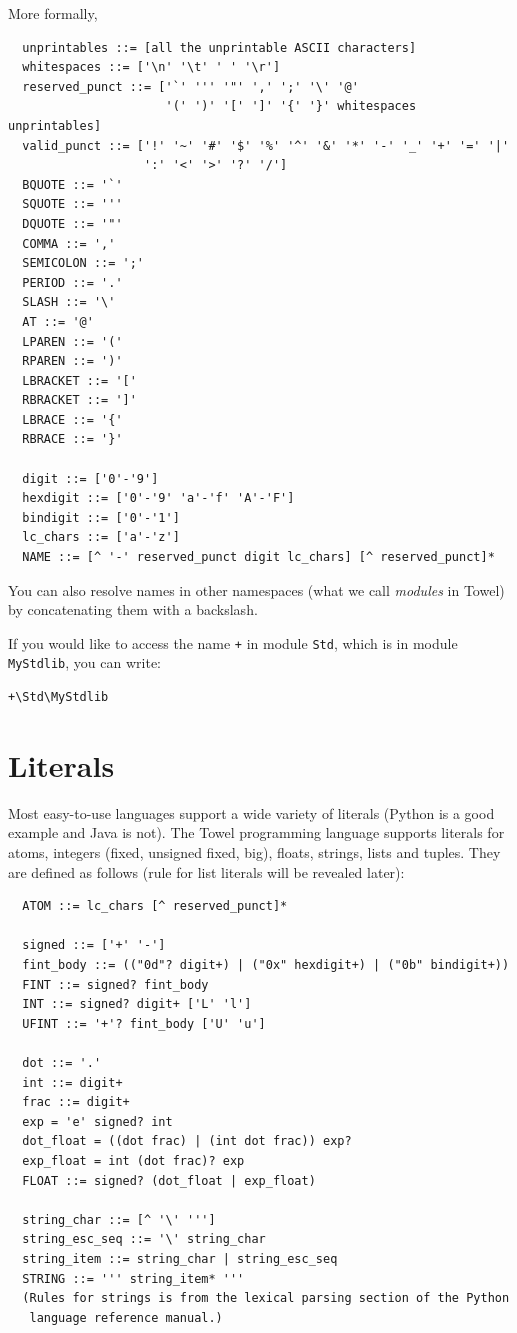 \documentclass{report}
\begin{document}
More formally,
\begin{verbatim}
  unprintables ::= [all the unprintable ASCII characters]
  whitespaces ::= ['\n' '\t' ' ' '\r']
  reserved_punct ::= ['`' ''' '"' ',' ';' '\' '@' 
                      '(' ')' '[' ']' '{' '}' whitespaces unprintables]
  valid_punct ::= ['!' '~' '#' '$' '%' '^' '&' '*' '-' '_' '+' '=' '|'
                   ':' '<' '>' '?' '/']
  BQUOTE ::= '`'
  SQUOTE ::= '''
  DQUOTE ::= '"'
  COMMA ::= ','
  SEMICOLON ::= ';'
  PERIOD ::= '.'
  SLASH ::= '\'
  AT ::= '@'
  LPAREN ::= '('
  RPAREN ::= ')'
  LBRACKET ::= '['
  RBRACKET ::= ']'
  LBRACE ::= '{'
  RBRACE ::= '}'

  digit ::= ['0'-'9']
  hexdigit ::= ['0'-'9' 'a'-'f' 'A'-'F']
  bindigit ::= ['0'-'1']
  lc_chars ::= ['a'-'z']
  NAME ::= [^ '-' reserved_punct digit lc_chars] [^ reserved_punct]*
\end{verbatim}

You can also resolve names in other namespaces (what we call \textit{modules} in Towel) by concatenating them with a backslash.

\begin{mdframed}[style=example]
If you would like to access the name \texttt{+} in module \texttt{Std}, which is in module \texttt{MyStdlib}, you can write:

\begin{verbatim}
+\Std\MyStdlib
\end{verbatim}

\end{mdframed}

\section{Literals}

Most easy-to-use languages support a wide variety of literals (Python is a good example and Java is not). The Towel programming language supports literals for atoms, integers (fixed, unsigned fixed, big), floats, strings, lists and tuples. They are defined as follows (rule for list literals will be revealed later):
\begin{verbatim}
  ATOM ::= lc_chars [^ reserved_punct]*

  signed ::= ['+' '-']
  fint_body ::= (("0d"? digit+) | ("0x" hexdigit+) | ("0b" bindigit+))
  FINT ::= signed? fint_body
  INT ::= signed? digit+ ['L' 'l']
  UFINT ::= '+'? fint_body ['U' 'u']

  dot ::= '.'
  int ::= digit+
  frac ::= digit+
  exp = 'e' signed? int
  dot_float = ((dot frac) | (int dot frac)) exp?
  exp_float = int (dot frac)? exp
  FLOAT ::= signed? (dot_float | exp_float)

  string_char ::= [^ '\' ''']
  string_esc_seq ::= '\' string_char
  string_item ::= string_char | string_esc_seq
  STRING ::= ''' string_item* '''
  (Rules for strings is from the lexical parsing section of the Python
   language reference manual.)
\end{verbatim}
\end{document}
